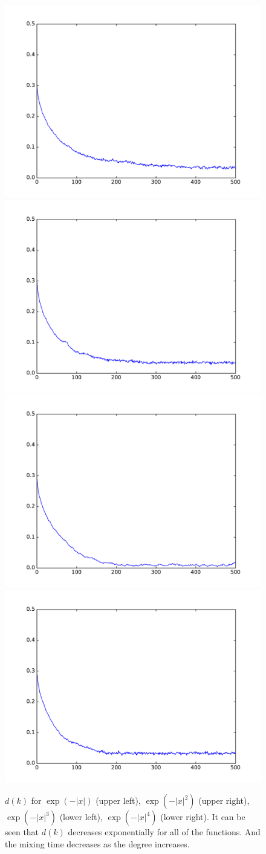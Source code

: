 \documentclass[preprint,12pt,3p]{elsarticle}
\begin{document}
\begin{figure}
\centering

\includegraphics[width=.3\textwidth]{../figure/sim3/case1_l1.pdf}
\includegraphics[width=.3\textwidth]{../figure/sim3/case2_l1.pdf}\\
\includegraphics[width=.3\textwidth]{../figure/sim3/case3_l1.pdf}
\includegraphics[width=.3\textwidth]{../figure/sim3/case4_l1.pdf}
\caption{$d(k)$ for $\exp(- |x|)$ (upper left), $\exp(- |x|^2)$ (upper right), $\exp(- |x|^3)$ (lower left), $\exp(- |x|^4)$ (lower right). It can be seen that $d(k)$ decreases exponentially for all of the functions. And the mixing time decreases as the degree increases.}\label{Fig:sim3_1}
\end{figure}
\end{document}
